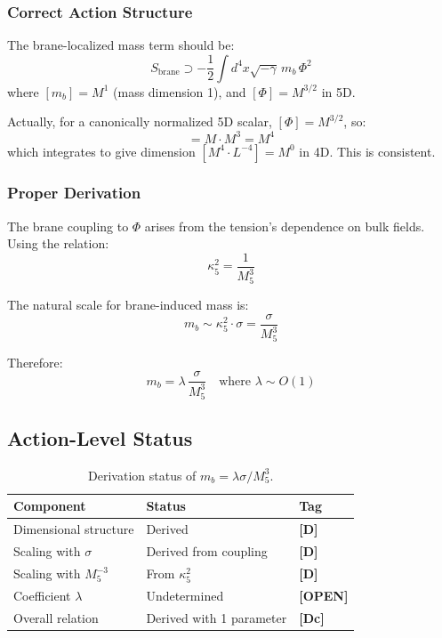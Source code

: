 \documentclass[11pt,a4paper]{article}
\newcommand{\Mfive}{M_5}
\newcommand{\mb}{m_b}
\newcommand{\tagD}{\textbf{[D]}}
\newcommand{\tagDc}{\textbf{[Dc]}}
\newcommand{\tagOPEN}{\textbf{[OPEN]}}
\theoremstyle{definition}
\theoremstyle{plain}
\theoremstyle{remark}
\begin{document}
\subsubsection{Correct Action Structure}

The brane-localized mass term should be:
\begin{equation}
S_{\mathrm{brane}} \supset -\frac{1}{2}\int d^4x \sqrt{-\gamma} \, \mb \, \Phi^2
\label{eq:correct-mass-term}
\end{equation}
where $[\mb] = M^1$ (mass dimension 1), and $[\Phi] = M^{3/2}$ in 5D.

Actually, for a canonically normalized 5D scalar, $[\Phi] = M^{3/2}$, so:
\begin{equation}
[\mb\,\Phi^2] = M \cdot M^3 = M^4
\label{eq:dim-check-2}
\end{equation}
which integrates to give dimension $[M^4 \cdot L^{-4}] = M^0$ in 4D. This is consistent.

\subsubsection{Proper Derivation}

The brane coupling to $\Phi$ arises from the tension's dependence on bulk fields.
Using the relation:
\begin{equation}
\kappa_5^2 = \frac{1}{\Mfive^3}
\label{eq:kappa5}
\end{equation}

The natural scale for brane-induced mass is:
\begin{equation}
\mb \sim \kappa_5^2 \cdot \sigma = \frac{\sigma}{\Mfive^3}
\label{eq:mb-natural}
\end{equation}

Therefore:
\begin{equation}
\boxed{\mb = \lambda \, \frac{\sigma}{\Mfive^3} \quad \text{where } \lambda \sim O(1)}
\label{eq:mb-final}
\end{equation}

\subsection{Action-Level Status}

\begin{table}[htbp]
\centering
\caption{Derivation status of $\mb = \lambda\sigma/\Mfive^3$.}
\label{tab:mb-status}
\begin{tabular}{@{}lll@{}}
\toprule
Component & Status & Tag \\
\midrule
Dimensional structure & Derived & \tagD{} \\
Scaling with $\sigma$ & Derived from coupling & \tagD{} \\
Scaling with $\Mfive^{-3}$ & From $\kappa_5^2$ & \tagD{} \\
Coefficient $\lambda$ & Undetermined & \tagOPEN{} \\
\midrule
Overall relation & Derived with 1 parameter & \tagDc{} \\
\bottomrule
\end{tabular}
\end{table}
\end{document}
